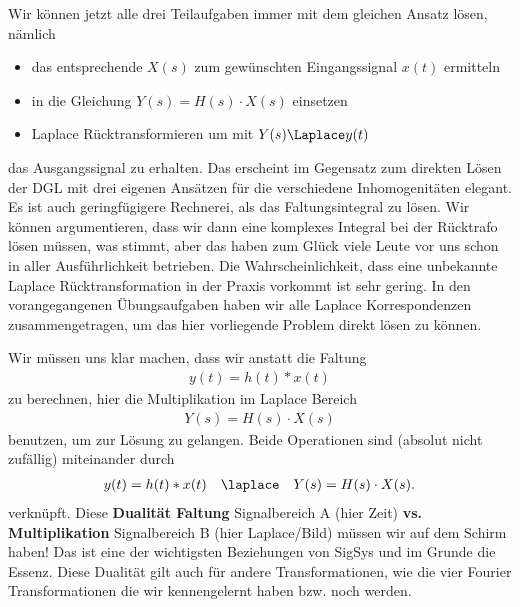 \begin{ExCalc}
Wir können jetzt alle drei Teilaufgaben immer mit
dem gleichen Ansatz lösen, nämlich

\begin{itemize}
  \item das entsprechende $X(s)$ zum gewünschten
  Eingangssignal $x(t)$ ermitteln
  \item in die Gleichung $Y(s)=H(s) \cdot X(s)$ einsetzen
  \item Laplace Rücktransformieren um mit $Y(s) \Laplace y(t)$
\end{itemize}
das Ausgangssignal zu erhalten.
%
Das erscheint im Gegensatz zum direkten Lösen der DGL mit drei eigenen Ansätzen
für die verschiedene Inhomogenitäten elegant.
%
Es ist auch geringfügigere Rechnerei, als das Faltungsintegral zu lösen.
%
Wir können argumentieren, dass wir dann eine komplexes Integral bei der Rücktrafo
lösen müssen, was stimmt, aber das haben zum Glück viele Leute vor uns schon
in aller Ausführlichkeit betrieben. Die Wahrscheinlichkeit, dass eine
unbekannte Laplace Rücktransformation in der Praxis  vorkommt ist sehr gering.
%
In den vorangegangenen Übungsaufgaben haben wir alle Laplace Korrespondenzen
zusammengetragen, um das hier vorliegende Problem direkt lösen zu können.
%

Wir müssen uns klar machen, dass wir anstatt die Faltung
\begin{align}
y(t) = h(t) \ast x(t)
\end{align}
zu berechnen, hier die Multiplikation im Laplace Bereich
\begin{align}
Y(s) = H(s) \cdot X(s)
\end{align}
benutzen, um zur Lösung zu gelangen. Beide Operationen sind (absolut nicht zufällig)
miteinander durch
\begin{align}
\label{eq:4408E33353_duality}
y(t) = h(t) \ast x(t) \quad \laplace \quad Y(s) = H(s) \cdot X(s).
\end{align}
verknüpft. Diese \textbf{Dualität Faltung} Signalbereich A (hier Zeit)
\textbf{vs. Multiplikation} Signalbereich B (hier Laplace/Bild) müssen wir auf dem Schirm haben! Das ist
eine der wichtigsten Beziehungen von SigSys und im Grunde die Essenz.
Diese Dualität gilt auch für andere Transformationen, wie die vier Fourier
Transformationen die wir kennengelernt haben bzw. noch werden.
%





\end{ExCalc}
